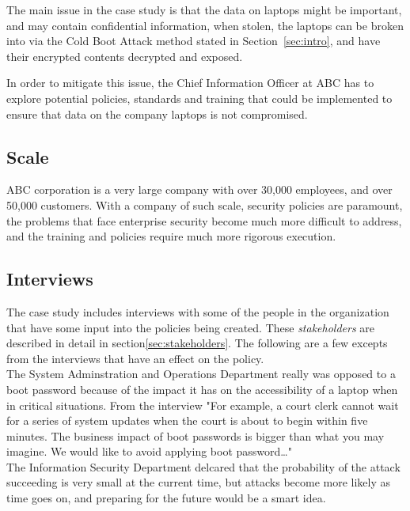 \documentclass{article}
\numberwithin{equation}{section} %
\numberwithin{figure}{section} %
\numberwithin{table}{section} %
\begin{document}
The main issue in the case study is that the data on laptops might be important, and may contain confidential information, when stolen, the laptops can be broken into via the Cold Boot Attack method stated in Section~\ref{sec:intro}, and have their encrypted contents decrypted and exposed. 

In order to mitigate this issue, the Chief Information Officer at ABC has to explore potential policies, standards and training that could be implemented to ensure that data on the company laptops is not compromised. \\

\subsection{Scale}
ABC corporation is a very large company with over 30,000 employees, and over 50,000 customers.  With a company of such scale, security policies are paramount, the problems that face enterprise security become much more difficult to address, and the training and policies require much more rigorous execution.\\

\subsection{Interviews}
\label{sec:interviews}
The case study includes interviews with some of the people in the organization that have some input into the policies being created.  These \emph{stakeholders} are described in detail in section\ref{sec:stakeholders}.  The following are a few excepts from the interviews that have an effect on the policy.\\

The System Adminstration and Operations Department really was opposed to a boot password because of the impact it has on the accessibility of a laptop when in critical situations.  From the interview "For example, a court clerk cannot wait for a series of system updates when the court is about to begin within five minutes. The business impact of boot passwords is bigger than what you may imagine. We would like to avoid applying boot password…" \\ 

The Information Security Department delcared that the probability of the attack succeeding is very small at the current time,  but attacks become more likely as time goes on, and preparing for the future would be a smart idea.\\
 
\end{document}
